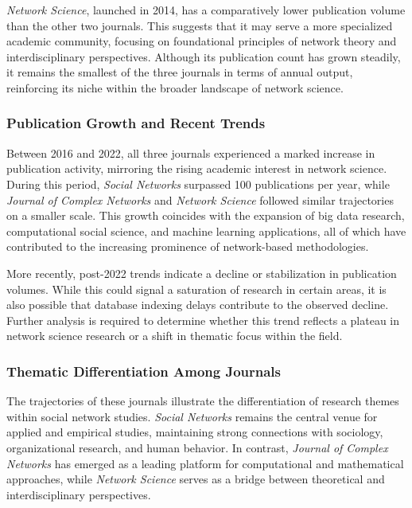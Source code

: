\documentclass[twocolumn]{article}
\begin{document}
	\textit{Network Science}, launched in 2014, has a comparatively lower publication volume than the other two journals. This suggests that it may serve a more specialized academic community, focusing on foundational principles of network theory and interdisciplinary perspectives. Although its publication count has grown steadily, it remains the smallest of the three journals in terms of annual output, reinforcing its niche within the broader landscape of network science.
	
	\subsubsection*{Publication Growth and Recent Trends}
	
	Between 2016 and 2022, all three journals experienced a marked increase in publication activity, mirroring the rising academic interest in network science. During this period, \textit{Social Networks} surpassed 100 publications per year, while \textit{Journal of Complex Networks} and \textit{Network Science} followed similar trajectories on a smaller scale. This growth coincides with the expansion of big data research, computational social science, and machine learning applications, all of which have contributed to the increasing prominence of network-based methodologies.
	
	More recently, post-2022 trends indicate a decline or stabilization in publication volumes. While this could signal a saturation of research in certain areas, it is also possible that database indexing delays contribute to the observed decline. Further analysis is required to determine whether this trend reflects a plateau in network science research or a shift in thematic focus within the field.
	
	\subsubsection*{Thematic Differentiation Among Journals}
	
	The trajectories of these journals illustrate the differentiation of research themes within social network studies. \textit{Social Networks} remains the central venue for applied and empirical studies, maintaining strong connections with sociology, organizational research, and human behavior. In contrast, \textit{Journal of Complex Networks} has emerged as a leading platform for computational and mathematical approaches, while \textit{Network Science} serves as a bridge between theoretical and interdisciplinary perspectives.
	
\end{document}
